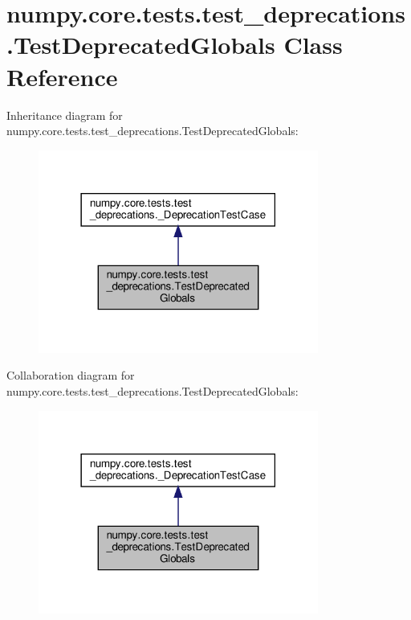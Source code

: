 \hypertarget{classnumpy_1_1core_1_1tests_1_1test__deprecations_1_1TestDeprecatedGlobals}{}\section{numpy.\+core.\+tests.\+test\+\_\+deprecations.\+Test\+Deprecated\+Globals Class Reference}
\label{classnumpy_1_1core_1_1tests_1_1test__deprecations_1_1TestDeprecatedGlobals}


Inheritance diagram for numpy.\+core.\+tests.\+test\+\_\+deprecations.\+Test\+Deprecated\+Globals\+:
\nopagebreak
\begin{figure}[H]
\begin{center}
\leavevmode
\includegraphics[width=261pt]{classnumpy_1_1core_1_1tests_1_1test__deprecations_1_1TestDeprecatedGlobals__inherit__graph}
\end{center}
\end{figure}


Collaboration diagram for numpy.\+core.\+tests.\+test\+\_\+deprecations.\+Test\+Deprecated\+Globals\+:
\nopagebreak
\begin{figure}[H]
\begin{center}
\leavevmode
\includegraphics[width=261pt]{classnumpy_1_1core_1_1tests_1_1test__deprecations_1_1TestDeprecatedGlobals__coll__graph}
\end{center}
\end{figure}

